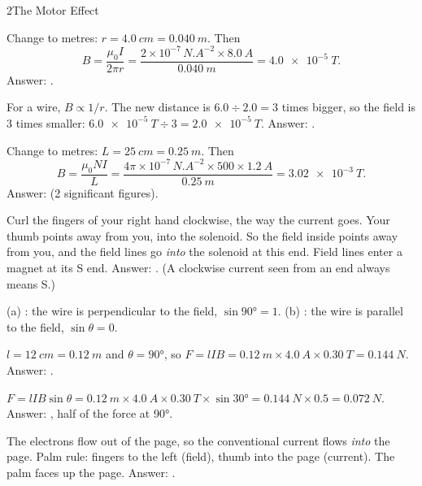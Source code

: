 \begin{chapteranswers}{2}{The Motor Effect}
  \item Change to metres: $r = \qty{4.0}{cm} = \qty{0.040}{m}$. Then
        \[ B = \frac{\mu_0 I}{2\pi r} = \frac{2 \times 10^{-7}\,\unit{N.A^{-2}} \times
        \qty{8.0}{A}}{\qty{0.040}{m}} = \qty{4.0e-5}{T}. \]
        Answer: .
  \item For a wire, $B \propto 1/r$. The new distance is $6.0 \div 2.0 = 3$ times bigger, so the
        field is 3 times smaller: $\qty{6.0e-5}{T} \div 3 = \qty{2.0e-5}{T}$.
        Answer: .
  \item Change to metres: $L = \qty{25}{cm} = \qty{0.25}{m}$. Then
        \[ B = \frac{\mu_0 NI}{L} = \frac{4\pi \times 10^{-7}\,\unit{N.A^{-2}} \times 500 \times
        \qty{1.2}{A}}{\qty{0.25}{m}} = \qty{3.02e-3}{T}. \]
        Answer:  (2 significant figures).
  \item Curl the fingers of your right hand clockwise, the way the current goes. Your thumb points
        away from you, into the solenoid. So the field inside points away from you, and the field
        lines go \emph{into} the solenoid at this end. Field lines enter a magnet at its S end.
        Answer: . (A clockwise current seen from an end always means S.)
  \item (a) : the wire is perpendicular to the field, $\sin\ang{90} = 1$.
        (b) : the wire is parallel to the field, $\sin\theta = 0$.
  \item $l = \qty{12}{cm} = \qty{0.12}{m}$ and $\theta = \ang{90}$, so
        $F = lIB = \qty{0.12}{m} \times \qty{4.0}{A} \times \qty{0.30}{T} = \qty{0.144}{N}$.
        Answer: .
  \item $F = lIB\sin\theta = \qty{0.12}{m} \times \qty{4.0}{A} \times \qty{0.30}{T} \times
        \sin\ang{30} = \qty{0.144}{N} \times 0.5 = \qty{0.072}{N}$.
        Answer: , half of the force at \ang{90}.
  \item The electrons flow out of the page, so the conventional current flows \emph{into} the
        page. Palm rule: fingers to the left (field), thumb into the page (current). The palm
        faces up the page. Answer: .

\end{chapteranswers}

